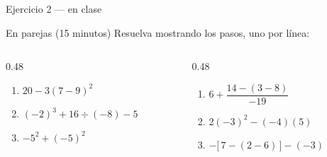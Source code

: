 \documentclass[aspectratio=169,10pt]{beamer}
\begin{document}
\begin{frame}{Ejercicio 2 — en clase}
  \begin{alertblock}{En parejas (15 minutos)}
    \scriptsize
    Resuelva mostrando  los pasos, uno por línea:

    \vspace{0.25cm}
    \begin{columns}[T,onlytextwidth]
      \begin{column}{0.48\textwidth}
        \begin{enumerate}\setlength{\itemsep}{0.15cm}
          \item $20 - 3(7-9)^2$
          \item $(-2)^3 + 16 \div (-8) - 5$
          \item $-5^2 + (-5)^2$
        \end{enumerate}
      \end{column}
      \begin{column}{0.48\textwidth}
        \begin{enumerate}\setlength{\itemsep}{0.15cm}
          \setcounter{enumi}{3}
          \item $6 + \dfrac{14 - (3-8)}{-19}$
          \item $2(-3)^2 - (-4)(5)$
          \item $-\big[\,7 - (2-6)\,\big] - (-3)$
        \end{enumerate}
      \end{column}
    \end{columns}
  \end{alertblock}
\end{frame}
\end{document}
